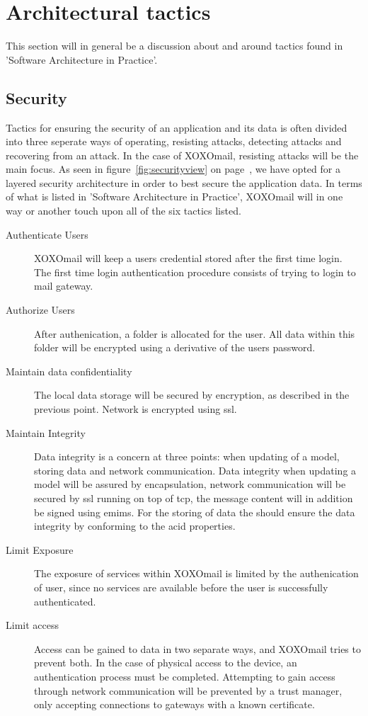 \newpage

\section{Architectural tactics}
	This section will in general be a discussion about and around tactics found in 'Software Architecture in Practice'\cite{bib:archi}. 
	\subsection{Security}
		Tactics for ensuring the security of an application and its data is often divided into three seperate ways of operating, resisting attacks, detecting attacks and recovering from an attack. 
		In the case of XOXOmail, resisting attacks will be the main focus. As seen in figure~\ref{fig:securityview} on page~\pageref{fig:securityview}, we have opted for a layered security architecture in order to best secure the application data. In terms of what is listed in 'Software Architecture in Practice'\cite[p. 119]{bib:archi}, XOXOmail will in one way or another touch upon all of the six tactics listed. 

		\begin{description}
			\item[Authenticate Users] XOXOmail will keep a users credential stored after the first time login. The first time login authentication procedure consists of trying to login to mail gateway.
			\item[Authorize Users] After authenication, a folder is allocated for the user. All data within this folder will be encrypted using a derivative of the users password. 
			\item[Maintain data confidentiality] The local data storage will be secured by encryption, as described in the previous point. Network is encrypted using \gls{ssl}. 
			\item[Maintain Integrity] Data integrity is a concern at three points: when updating of a model, storing data and network communication. Data integrity when updating a model will be assured by encapsulation, network communication will be secured by \gls{ssl} running on top of \gls{tcp}, the message content will in addition be signed using \gls{emims}. For the storing of data the  should ensure the data integrity by conforming to the \gls{acid} properties.
			\item[Limit Exposure] The exposure of services within XOXOmail is limited by the authenication of user, since no services are available before the user is successfully authenticated.
			\item[Limit access] Access can be gained to data in two separate ways, and XOXOmail tries to prevent both. In the case of physical access to the device, an authentication process must be completed. Attempting to gain access through network communication will be prevented by a trust manager, only accepting connections to gateways with a known certificate. 
		\end{description}

